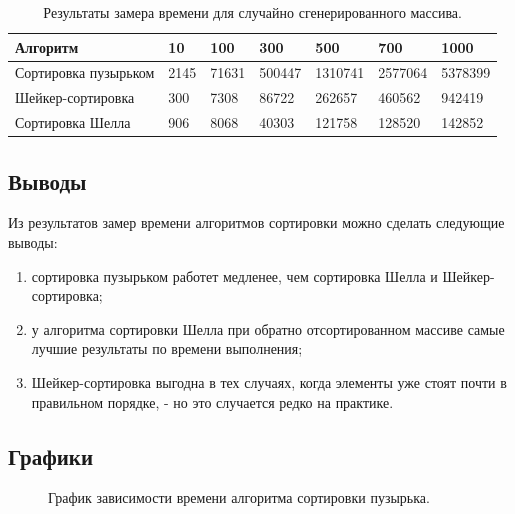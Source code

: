 \documentclass[a4paper]{article}
\begin{document}
\begin{table}[h]
	\caption{\label{table3} Результаты замера времени для случайно сгенерированного массива.}
	\begin{center}
		\begin{tabular}{|p{150pt}|p{40pt}|p{50pt}|p{50pt}|p{50pt}|p{50pt} |p{50pt}|}
			\hline
			\textbf{Алгоритм} &  \textbf{10}&\textbf{100} & \textbf{300} &\textbf{500} & \textbf{700} & \textbf{1000}\\ \hline
			Сортировка пузырьком & 2145&71631 & 500447 & 1310741 & 2577064 & 5378399 \\	\hline
			Шейкер-сортировка &300& 7308 &86722 & 262657 & 460562 &  942419\\ \hline
			Сортировка Шелла &906& 8068 & 40303 & 121758 &128520 & 142852\\ \hline
		\end{tabular}
	\end{center}
\end{table}

\clearpage

\subsection{Выводы}
Из результатов замер времени алгоритмов сортировки можно сделать следующие выводы:
\begin{enumerate}
	\item сортировка пузырьком работет медленее, чем сортировка Шелла и Шейкер-сортировка;
	\item у алгоритма сортировки Шелла при обратно отсортированном массиве самые лучшие результаты по времени выполнения;
	\item Шейкер-сортировка выгодна в тех случаях, когда элементы уже стоят почти в правильном порядке, - но это случается редко на практике.\cite{nikvirt}
\end{enumerate}
\clearpage

\subsection{Графики}
\begin{figure}[h]
	\caption{График зависимости времени алгоритма сортировки пузырька. \centering}
	\label{image5}
\end{figure}
\end{document}
